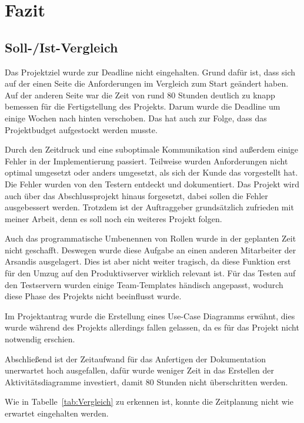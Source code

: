 \section{Fazit} 
\label{sec:Fazit}

\subsection{Soll-/Ist-Vergleich}
\label{sec:SollIstVergleich}

Das Projektziel wurde zur Deadline nicht eingehalten.
Grund dafür ist, dass sich auf der einen Seite die Anforderungen im Vergleich zum Start geändert haben.
Auf der anderen Seite war die Zeit von rund 80 Stunden deutlich zu knapp bemessen für die Fertigstellung des Projekts.
Darum wurde die Deadline um einige Wochen nach hinten verschoben.
Das hat auch zur Folge, dass das Projektbudget aufgestockt werden musste.

Durch den Zeitdruck und eine suboptimale Kommunikation sind außerdem einige Fehler in der Implementierung passiert.
Teilweise wurden Anforderungen nicht optimal umgesetzt oder anders umgesetzt, als sich der Kunde das vorgestellt hat.
Die Fehler wurden von den Testern entdeckt und dokumentiert.
Das Projekt wird auch über das Abschlussprojekt hinaus forgesetzt, dabei sollen die Fehler ausgebessert werden.
Trotzdem ist der Auftraggeber grundsätzlich zufrieden mit meiner Arbeit, denn es soll noch ein weiteres Projekt folgen.

Auch das programmatische Umbenennen von Rollen wurde in der geplanten Zeit nicht geschafft.
Deswegen wurde diese Aufgabe an einen anderen Mitarbeiter der Arsandis ausgelagert.
Dies ist aber nicht weiter tragisch, da diese Funktion erst für den Umzug auf den Produktivserver wirklich relevant ist.
Für das Testen auf den Testservern wurden einige Team-Templates händisch angepasst, wodurch diese Phase des Projekts nicht beeinflusst wurde.

Im Projektantrag wurde die Erstellung eines Use-Case Diagramms erwähnt, dies wurde während des Projekts allerdings fallen gelassen, da es für das Projekt nicht notwendig erschien.

Abschließend ist der Zeitaufwand für das Anfertigen der Dokumentation unerwartet hoch ausgefallen, dafür wurde weniger Zeit in das Erstellen der Aktivitätsdiagramme investiert, damit 80 Stunden nicht überschritten werden.

Wie in Tabelle~\ref{tab:Vergleich} zu erkennen ist, konnte die Zeitplanung nicht wie erwartet eingehalten werden.


